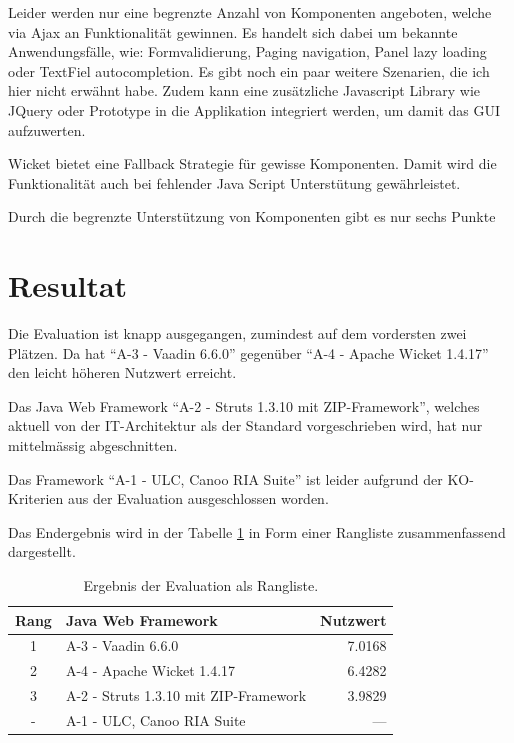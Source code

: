   Leider werden nur eine begrenzte Anzahl von Komponenten angeboten, welche
  via \ac{Ajax} an Funktionalität gewinnen. Es handelt sich dabei um bekannte
  Anwendungsfälle, wie: Formvalidierung, Paging navigation, Panel lazy loading
  oder TextFiel autocompletion. Es gibt noch ein paar weitere Szenarien,
  die ich hier nicht erwähnt habe. Zudem kann eine zusätzliche Javascript
  Library wie JQuery oder Prototype in die Applikation integriert werden, um
  damit das \ac{GUI} aufzuwerten.
  
  Wicket bietet eine Fallback Strategie für gewisse Komponenten. Damit wird die
  Funktionalität auch bei fehlender Java Script Unterstütung gewährleistet.
  
  Durch die begrenzte Unterstützung von Komponenten gibt es nur sechs Punkte

  \section{Resultat}
  
  Die Evaluation ist knapp ausgegangen, zumindest auf dem vordersten zwei
  Plätzen. Da hat ``A-3 - Vaadin 6.6.0'' gegenüber ``A-4 - Apache Wicket
  1.4.17'' den leicht höheren Nutzwert erreicht.
  
  Das Java Web Framework ``A-2 - Struts 1.3.10 mit ZIP-Framework'', welches
  aktuell von der IT-Architektur als der Standard vorgeschrieben wird, hat nur
  mittelmässig abgeschnitten.

  Das Framework ``A-1 - ULC, Canoo RIA Suite'' ist leider aufgrund der
  KO-Kriterien aus der Evaluation ausgeschlossen worden.
  
  Das Endergebnis wird in der Tabelle \ref{tab:ergebnisDerEvaluation} in Form
  einer Rangliste zusammenfassend dargestellt.
  \newline
  
  \begin{table}[ht]
    \sffamily 
    \begin{center}
      \begin{tabular}{clr}
        \toprule
        \textbf{Rang} & \textbf{Java Web Framework} & \textbf{Nutzwert} \\
        \midrule
        1 & A-3 - Vaadin 6.6.0 & 7.0168 \\
        2 & A-4 - Apache Wicket 1.4.17 & 6.4282 \\
        3 & A-2 - Struts 1.3.10 mit ZIP-Framework & 3.9829 \\
        - & A-1 - ULC, Canoo RIA Suite & --- \\
        \bottomrule
      \end{tabular}
      \caption{Ergebnis der Evaluation als Rangliste.}
      \label{tab:ergebnisDerEvaluation}
    \end{center}
  \end{table}
